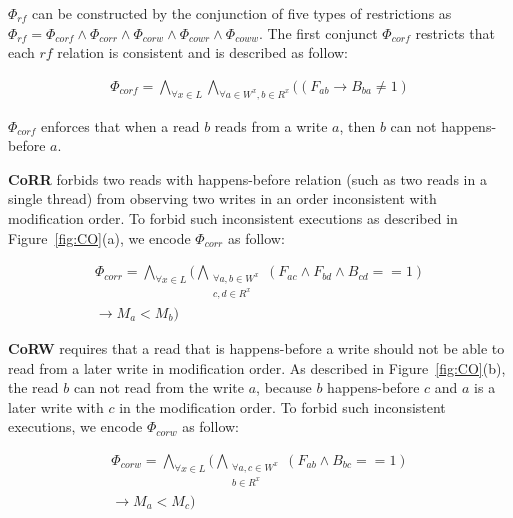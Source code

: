 \documentclass[preprint, numbers, 10pt]{sigplanconf}
\begin{document}
$\Phi_{rf}$ can be constructed by the conjunction of five
types of restrictions as $\Phi_{rf}=\Phi_{corf}\wedge\Phi_{corr}\wedge \Phi_{corw}
\wedge\Phi_{cowr}\wedge\Phi_{coww}$. The first conjunct $\Phi_{corf}$ restricts that each $rf$ relation
is consistent and is described as follow: 

\begin{equation}
\begin{aligned}
\Phi_{corf} = \bigwedge_{\forall x\in L }\bigwedge_{\forall a\in W^x, b\in R^x} ((F_{ab}\rightarrow B_{ba}\neq 1) 
\end{aligned}
\end{equation} 

$\Phi_{corf}$ enforces that when a read $b$ reads from a write $a$, 
then $b$ can not happens-before $a$. 

\textbf{CoRR} forbids two reads with happens-before relation (such as two reads
in a single thread) from observing two writes in an order inconsistent with modification order. 
To forbid such inconsistent executions as described in Figure~\ref{fig:CO}(a), 
we encode $\Phi_{corr}$ as follow: 

\begin{equation}
\begin{aligned}
\Phi_{corr} = \bigwedge_{\forall x\in L}(\bigwedge_{\substack{\forall a,b\in W^x\\c,d\in R^x}} 
(F_{ac}\wedge F_{bd}\wedge B_{cd}==1) \\
\rightarrow M_{a}<M_{b})
\end{aligned}
\end{equation} 

\textbf{CoRW} requires that a read that is happens-before a 
write should not be able to read from a later write in modification order.
As described in Figure~\ref{fig:CO}(b), the read $b$ can not read from
the write $a$, because $b$ happens-before $c$ and $a$ is a later write 
with $c$ in the modification order. To forbid such inconsistent executions, we 
encode $\Phi_{corw}$ as follow: 

\begin{equation}
\begin{aligned}
\Phi_{corw} = \bigwedge_{\forall x\in L}(\bigwedge_{\substack{\forall a,c\in W^x\\b\in R^x}}
(F_{ab}\wedge B_{bc}==1)\\ \rightarrow M_{a}<M_{c})
\end{aligned}
\end{equation} 
\end{document}
